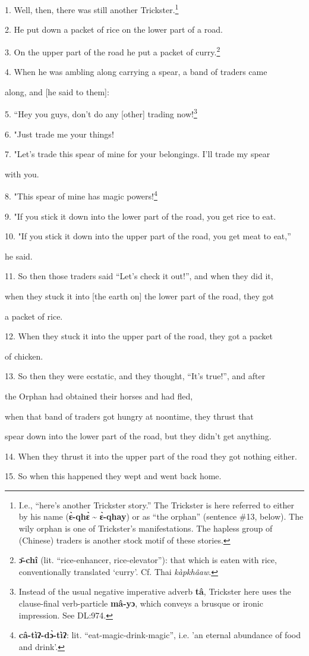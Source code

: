 \setcounter{footnote}{0}

1. Well, then, there was still another Trickster.\footnote{I.e., ``here's another Trickster story.'' The Trickster is here referred to either by his name (\textbf{ɛ̀-qhɛ̀} \textasciitilde{} \textbf{ɛ̀-qhay}) or as ``the orphan'' (sentence \#13, below). The wily orphan is one of Trickster's manifestations. The hapless group of (Chinese) traders is another stock motif of these stories.}

2. He put down a packet of rice on the lower part of a road.

3. On the upper part of the road he put a packet of curry.\footnote{\textbf{ɔ̄-chî} (lit. ``rice-enhancer, rice-elevator''): that which is eaten with rice, conventionally translated `curry'. Cf. Thai \textit{kàpkhâaw}.}

4. When he was ambling along carrying a spear, a band of traders came

along, and [he said to them]:

5. ``Hey you guys, don't do any [other] trading now!\footnote{Instead of the usual negative imperative adverb \textbf{tâ}, Trickster here uses the clause-final verb-particle \textbf{mâ-yɔ}, which conveys a brusque or ironic impression. See DL:974.}

6. "Just trade me your things!

7. "Let's trade this spear of mine for your belongings. I'll trade my
spear

with you.

8. "This spear of mine has magic powers!\footnote{\textbf{câ-tìʔ-dɔ̀-tìʔ}: lit. ``eat-magic-drink-magic'', i.e. 'an eternal abundance of food and drink'.}

9. "If you stick it down into the lower part of the road, you get rice
to eat.

10. "If you stick it down into the upper part of the road, you get meat
to eat,''

he said.

11. So then those traders said ``Let's check it out!'', and when they did it,


when they stuck it into [the earth on] the lower part of the road, they got


a packet of rice.

12. When they stuck it into the upper part of the road, they got a packet


of chicken.

13. So then they were ecstatic, and they thought, ``It's true!'', and after


the Orphan had obtained their horses and had fled,

when that band of traders got hungry at noontime, they thrust that

spear down into the lower part of the road, but they didn't get anything.

14. When they thrust it into the upper part of the road they got nothing either.

15. So when this happened they wept and went back home.

